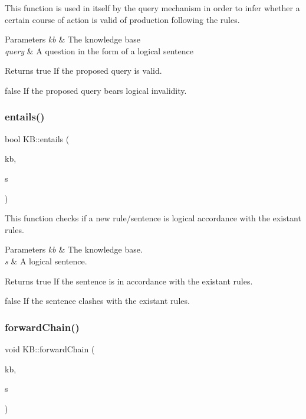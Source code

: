 This function is used in itself by the query mechanism in order to infer whether a certain course of action is valid of production following the rules. 


\begin{DoxyParams}{Parameters}
{\em kb} & The knowledge base \\
\hline
{\em query} & A question in the form of a logical sentence \\
\hline
\end{DoxyParams}
\begin{DoxyReturn}{Returns}
true If the proposed query is valid. 

false If the proposed query bears logical invalidity. 
\end{DoxyReturn}
\mbox{\label{classKB_afd8d8289f3a2e60e2118b822f5c99576}} 
\subsubsection{\texorpdfstring{entails()}{entails()}}
{\footnotesize\ttfamily bool K\+B\+::entails (\begin{DoxyParamCaption}\item[{\mbox{\hyperlink{classKB}{KB}}}]{kb,  }\item[{vector$<$ \mbox{\hyperlink{classSentence}{Sentence}} $>$}]{s }\end{DoxyParamCaption})}



This function checks if a new rule/sentence is logical accordance with the existant rules. 


\begin{DoxyParams}{Parameters}
{\em kb} & The knowledge base. \\
\hline
{\em s} & A logical sentence. \\
\hline
\end{DoxyParams}
\begin{DoxyReturn}{Returns}
true If the sentence is in accordance with the existant rules. 

false If the sentence clashes with the existant rules. 
\end{DoxyReturn}
\mbox{\label{classKB_a1d77685c04f42bb2fba29ed81773dbc7}} 
\subsubsection{\texorpdfstring{forward\+Chain()}{forwardChain()}}
{\footnotesize\ttfamily void K\+B\+::forward\+Chain (\begin{DoxyParamCaption}\item[{\mbox{\hyperlink{classKB}{KB}}}]{kb,  }\item[{vector$<$ \mbox{\hyperlink{classSentence}{Sentence}} $>$}]{s }\end{DoxyParamCaption})}



